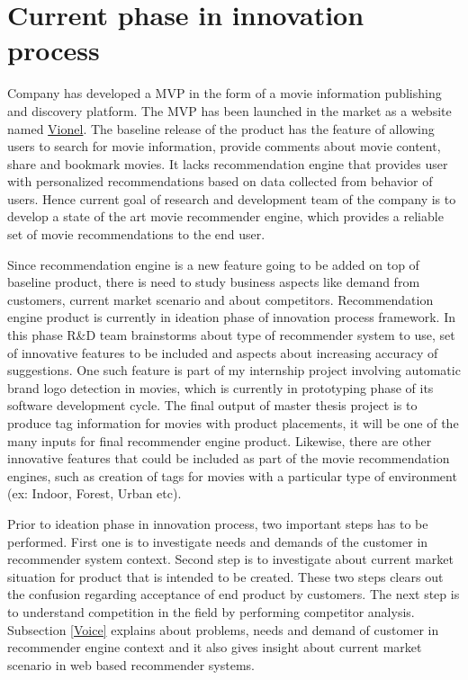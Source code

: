 \section{Current phase in innovation process} 
 Company has developed a \acrshort{MVP} in the form of a movie information publishing and discovery platform. The \acrshort{MVP} has been launched in the market as a website named \href{www.vionel.com}{Vionel}. The baseline release of the product has the feature of allowing users to search for movie information, provide comments about movie content, share and bookmark movies. It lacks recommendation engine that provides user with personalized recommendations based on data collected from behavior of users. Hence current goal of research and development team of the company is to develop a state of the art movie recommender engine, which provides a reliable set of movie recommendations to the end user. 
 \par Since recommendation engine is a new feature going to be added on top of baseline product, there is need to study business aspects like demand from customers, current market scenario and about competitors. Recommendation engine product is currently in ideation phase of innovation process framework. In this phase R\&D team brainstorms about type of recommender system to use, set of innovative features to be included and aspects about increasing accuracy of suggestions. One such feature is part of my internship project involving automatic brand logo detection in movies, which is currently in prototyping phase of its software development cycle. The final output of master thesis project is to produce tag information for movies with product placements, it will be one of the many inputs for final recommender engine product. Likewise, there are other innovative features that could be included as part of the movie recommendation engines, such as creation of tags for movies with a particular type of environment (ex: Indoor, Forest, Urban etc). 
 \par Prior to ideation phase in innovation process, two important steps has to be performed. First one is to investigate needs and demands of the customer in recommender system context. Second step is to investigate about current market situation for product that is intended to be created. These two steps clears out the confusion regarding acceptance of end product by customers. The next step is to understand competition in the field by performing competitor analysis. Subsection \ref{Voice} explains about problems, needs and demand of customer in recommender engine context and it also gives insight about current market scenario in web based recommender systems.

